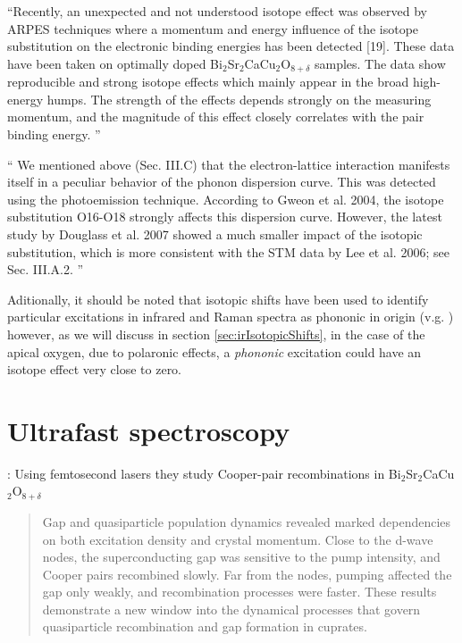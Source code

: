 ``Recently, an unexpected and not understood isotope effect was observed by ARPES techniques where a momentum and energy influence of the isotope substitution on the electronic binding energies has been detected [19]. 
These data have been taken on optimally doped Bi$_2$Sr$_2$CaCu$_2$O$_{8+\delta}$ samples. 
The data show reproducible and strong isotope effects which mainly appear in the broad high-energy humps. 
The strength of the effects depends strongly on the measuring momentum, and the magnitude of this effect closely correlates with the pair binding energy. 
''\cite{Bishop2007}

``
We mentioned above (Sec. III.C) that the electron-lattice interaction manifests itself in a peculiar behavior of the phonon dispersion curve. 
This was detected using the photoemission technique. 
According to Gweon et al. 2004, the isotope substitution O16-O18 strongly affects this dispersion curve. 
However, the latest study by Douglass et al. 2007 showed a much smaller impact of the isotopic substitution, which is more consistent with the STM data by Lee et al. 2006; see Sec. III.A.2.
''\cite{Kresin2009}

Aditionally, it should be noted that isotopic shifts have been used to identify particular excitations in infrared and Raman spectra as phononic in origin (v.g. \cite{Thomsen1990}) however, as we will discuss in section \ref{sec:irIsotopicShifts}, in the case of the apical oxygen, due to polaronic effects, a \textit{phononic} excitation could have an isotope effect very close to zero.

\section{Ultrafast spectroscopy}
\label{sec:ultrafast_spect}

\cite{Smallwood2012}: Using femtosecond lasers they study Cooper-pair recombinations in Bi$_2$Sr$_2$CaCu$_2$O$_{8+\delta}$
\begin{quote}Gap and quasiparticle population dynamics revealed marked dependencies on both excitation density and crystal momentum. Close to the d-wave nodes, the superconducting gap was sensitive to the pump intensity, and Cooper pairs recombined slowly. Far from the nodes, pumping affected the gap only weakly, and recombination processes were faster. These results demonstrate a new window into the dynamical processes that govern quasiparticle recombination and gap formation in cuprates.\end{quote}

